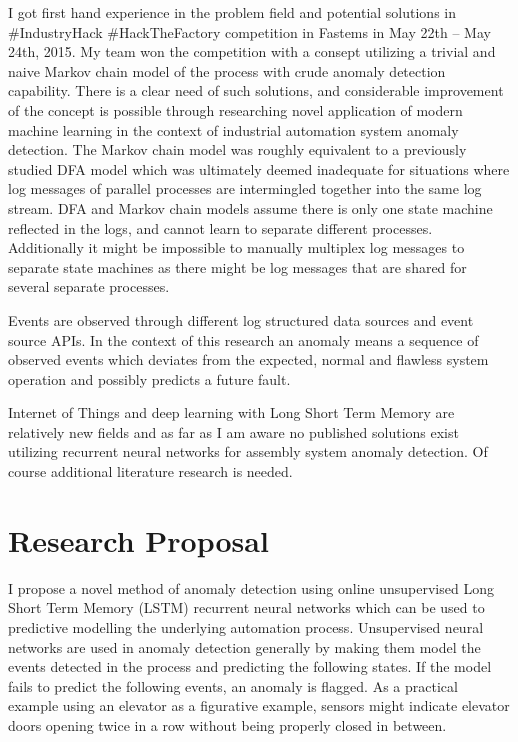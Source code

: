 \documentclass[a4paper,10pt]{article}
\begin{document}
I got first hand experience in the problem field and potential solutions in \#IndustryHack \#HackTheFactory competition in Fastems in May 22th – May 24th, 2015\cite{IndustryHack}.
My team won the competition with a consept utilizing a trivial and naive Markov chain model of the process with crude anomaly detection capability.
There is a clear need of such solutions, and considerable improvement of the concept is possible through researching novel application of modern machine learning in the context
of industrial automation system anomaly detection. The Markov chain model was roughly equivalent to a previously studied DFA model\cite{langer2011self} which was
ultimately deemed inadequate for
situations where log messages of parallel processes are intermingled together into the same log stream. DFA and Markov chain models assume there is only one state machine
reflected in the logs, and cannot learn to separate different processes. Additionally it might be impossible to manually multiplex log messages to separate state machines
as there might be log messages that are shared for several separate processes.

Events are observed through different log structured data sources and event source APIs. In the context of this research an anomaly means a sequence of observed events which
deviates from the expected, normal and flawless system operation and possibly predicts a future fault.

Internet of Things and deep learning with Long Short Term Memory are relatively new fields and as far as I am aware no published solutions exist utilizing
recurrent neural networks for assembly system anomaly detection. Of course additional literature research is needed.

\section{Research Proposal}

I propose a novel method of anomaly detection using online unsupervised Long Short Term Memory (LSTM)\cite{LSTM} recurrent neural networks which can be used to predictive
modelling\cite{gers2000learning} the underlying automation process. Unsupervised neural networks are used in anomaly detection generally by making them model the events detected
in the process and predicting the following states. If the model fails to predict the following events, an anomaly is flagged.
As a practical example using an elevator as a figurative example, sensors might indicate elevator doors opening twice in a row without being properly closed in between.
\end{document}
